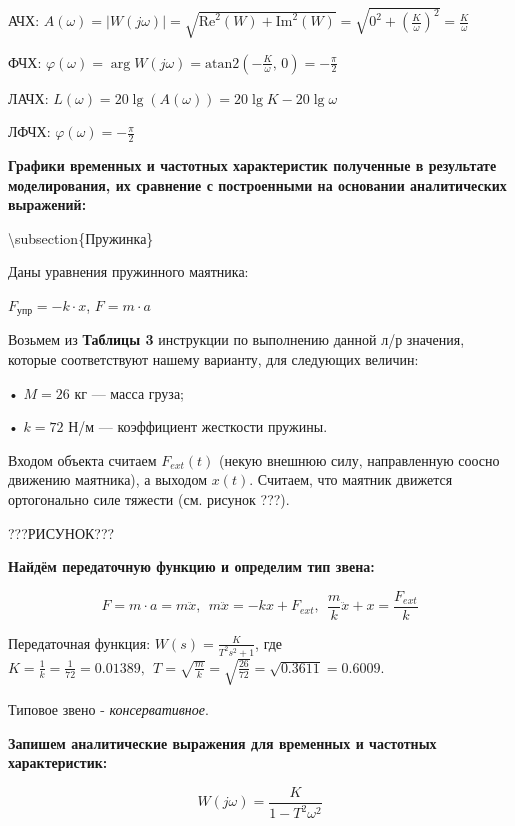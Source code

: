 АЧХ: $A(\omega )=|W(j\omega )|=\sqrt{{\text{Re}}^2 (W)+{\text{Im}}^2 (W)}=\sqrt{0^2 +{\left(\frac{K}{\omega }\right)}^2 }=\frac{K}{\omega }$

ФЧХ: $\varphi (\omega )=\arg W(j\omega )=\text{atan2}\left(-\frac{K}{\omega },\,0\right)=-\frac{\pi }{2}$

ЛАЧХ: $L(\omega )=20\lg (A(\omega ))=20\lg K-20\lg \omega$

ЛФЧХ: $\varphi (\omega )=-\frac{\pi }{2}$

\textbf{Графики временных и частотных характеристик полученные в результате моделирования, их сравнение с построенными на основании аналитических выражений:}







\textbackslash{}subsection\{Пружинка\}

Даны уравнения пружинного маятника:

$F_{\text{упр}} =-k\cdot x$, $F=m\cdot a$

Возьмем из \textbf{Таблицы 3} инструкции по выполнению данной л/р значения, которые соответствуют нашему варианту, для следующих величин:

• $M=26$ кг — масса груза;

• $k=72$ Н/м — коэффициент жесткости пружины.

Входом объекта считаем $F_{ext} (t)$ (некую внешнюю силу, направленную соосно движению маятника), а выходом $x(t)$. Считаем, что маятник движется ортогонально силе тяжести (см. рисунок ???).

???РИСУНОК???

\textbf{Найдём передаточную функцию и определим тип звена:}

\begin{par}
$$F=m\cdot a=m\ddot{x} ,~~m\ddot{x} =-kx+F_{ext} ,~~\frac{m}{k}\ddot{x} +x=\frac{F_{ext} }{k}$$
\end{par}

Передаточная функция: $W(s)=\frac{K}{T^2 s^2 +1}$, где $K=\frac{1}{k}=\frac{1}{72}=0.01389,~~T=\sqrt{\frac{m}{k}}=\sqrt{\frac{26}{72}}=\sqrt{0.3611}=0.6009$.

Типовое звено - \textit{консервативное}.

\textbf{Запишем аналитические выражения для временных и частотных характеристик:}

\begin{par}
$$W(j\omega )=\frac{K}{1-T^2 \omega^2 }$$
\end{par}

